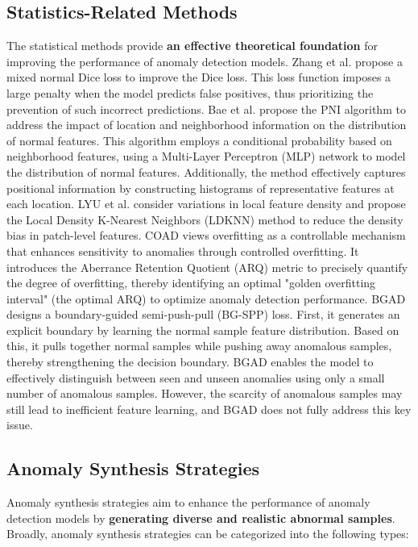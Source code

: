 \documentclass[journal,comsoc]{IEEEtran}
\begin{document}
\subsection{Statistics-Related Methods}
The statistical methods provide \textbf{an effective theoretical foundation} for improving the performance of anomaly detection models. Zhang et al. \cite{zhang2024sofs} propose a mixed normal Dice loss to improve the Dice loss. This loss function imposes a large penalty when the model predicts false positives, thus prioritizing the prevention of such incorrect predictions. Bae et al. \cite{bae2023pni} propose the PNI algorithm to address the impact of location and neighborhood information on the distribution of normal features. This algorithm employs a conditional probability based on neighborhood features, using a Multi-Layer Perceptron (MLP) network to model the distribution of normal features. Additionally, the method effectively captures positional information by constructing histograms of representative features at each location. LYU et al. \cite{lyu2024reb} consider variations in local feature density and propose the Local Density K-Nearest Neighbors (LDKNN) method to reduce the density bias in patch-level features. COAD \cite{qian2024friend} views overfitting as a controllable mechanism that enhances sensitivity to anomalies through controlled overfitting. It introduces the Aberrance Retention Quotient (ARQ) metric to precisely quantify the degree of overfitting, thereby identifying an optimal "golden overfitting interval" (the optimal ARQ) to optimize anomaly detection performance. BGAD \cite{yao2023bgad} designs a boundary-guided semi-push-pull (BG-SPP) loss. First, it generates an explicit boundary by learning the normal sample feature distribution. Based on this, it pulls together normal samples while pushing away anomalous samples, thereby strengthening the decision boundary. BGAD enables the model to effectively distinguish between seen and unseen anomalies using only a small number of anomalous samples. However, the scarcity of anomalous samples may still lead to inefficient feature learning, and BGAD does not fully address this key issue.


\subsection{Anomaly Synthesis Strategies}
Anomaly synthesis strategies aim to enhance the performance of anomaly detection models by \textbf{generating diverse and realistic abnormal samples}. Broadly, anomaly synthesis strategies can be categorized into the following types: 
\end{document}
